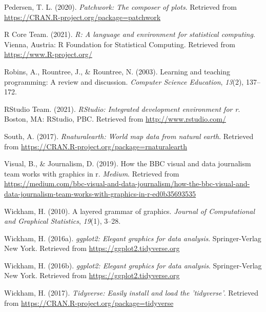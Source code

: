 \documentclass[
  english,
  doc,floatsintext]{apa6}
\newlength{\cslhangindent}
\newenvironment{CSLReferences}[2] %
 {%
  \setlength{\parindent}{0pt}
  \ifodd #1 \everypar{\setlength{\hangindent}{\cslhangindent}}\ignorespaces\fi
  \ifnum #2 > 0
  \setlength{\parskip}{#2\baselineskip}
  \fi
 }%
 {}
\begin{document}
\begin{CSLReferences}{1}{0}
\leavevmode{}%
Pedersen, T. L. (2020). \emph{Patchwork: The composer of plots}. Retrieved from \url{https://CRAN.R-project.org/package=patchwork}

\leavevmode{}%
R Core Team. (2021). \emph{R: A language and environment for statistical computing}. Vienna, Austria: R Foundation for Statistical Computing. Retrieved from \url{https://www.R-project.org/}

\leavevmode{}%
Robins, A., Rountree, J., \& Rountree, N. (2003). Learning and teaching programming: A review and discussion. \emph{Computer Science Education}, \emph{13}(2), 137--172.

\leavevmode{}%
RStudio Team. (2021). \emph{RStudio: Integrated development environment for r}. Boston, MA: RStudio, PBC. Retrieved from \url{http://www.rstudio.com/}

\leavevmode{}%
South, A. (2017). \emph{Rnaturalearth: World map data from natural earth}. Retrieved from \url{https://CRAN.R-project.org/package=rnaturalearth}

\leavevmode{}%
Visual, B., \& Journalism, D. (2019). How the BBC visual and data journalism team works with graphics in r. \emph{Medium}. Retrieved from \url{https://medium.com/bbc-visual-and-data-journalism/how-the-bbc-visual-and-data-journalism-team-works-with-graphics-in-r-ed0b35693535}

\leavevmode{}%
Wickham, H. (2010). A layered grammar of graphics. \emph{Journal of Computational and Graphical Statistics}, \emph{19}(1), 3--28.

\leavevmode{}%
Wickham, H. (2016a). \emph{ggplot2: Elegant graphics for data analysis}. Springer-Verlag New York. Retrieved from \url{https://ggplot2.tidyverse.org}

\leavevmode{}%
Wickham, H. (2016b). \emph{ggplot2: Elegant graphics for data analysis}. Springer-Verlag New York. Retrieved from \url{https://ggplot2.tidyverse.org}

\leavevmode{}%
Wickham, H. (2017). \emph{Tidyverse: Easily install and load the 'tidyverse'}. Retrieved from \url{https://CRAN.R-project.org/package=tidyverse}


\end{CSLReferences}
\end{document}
